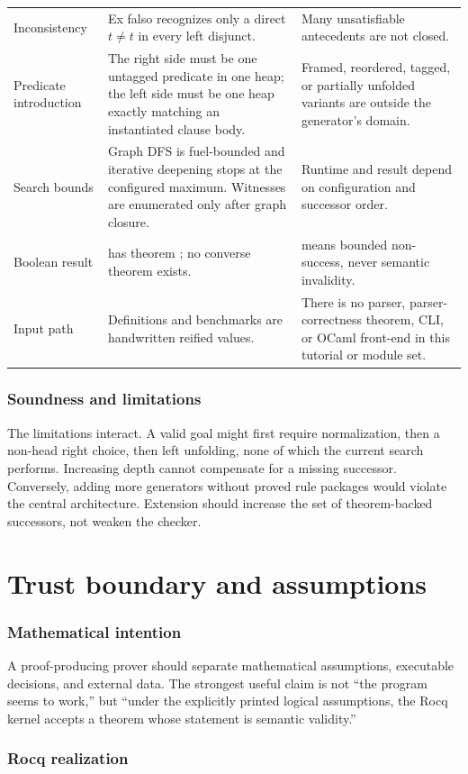 \documentclass[11pt,oneside]{book}
\DeclareRobustCommand{\code}[1]{\texttt{\detokenize{#1}}}
\newcommand{\mathintent}{\subsection*{Mathematical intention}}
\newcommand{\rocqreal}{\subsection*{Rocq realization}}
\newcommand{\soundlim}{\subsection*{Soundness and limitations}}
\begin{document}
\begin{longtable}{>{\raggedright\arraybackslash}p{}
                  >{\raggedright\arraybackslash}p{}
                  >{\raggedright\arraybackslash}p{}}
\addlinespace
Inconsistency & Ex falso recognizes only a direct \(t\neq t\) in every left
disjunct. & Many unsatisfiable antecedents are not closed.\\
\addlinespace
Predicate introduction & The right side must be one untagged predicate in one
heap; the left side must be one heap exactly matching an instantiated clause
body. & Framed, reordered, tagged, or partially unfolded variants are outside
the generator's domain.\\
\addlinespace
Search bounds & Graph DFS is fuel-bounded and iterative deepening stops at the
configured maximum.  Witnesses are enumerated only after graph closure. &
Runtime and result depend on configuration and successor order.\\
\addlinespace
Boolean result & \code{solvedb = true} has theorem \code{search_sound}; no
converse theorem exists. & \code{false} means bounded non-success, never
semantic invalidity.\\
\addlinespace
Input path & Definitions and benchmarks are handwritten reified values. &
There is no parser, parser-correctness theorem, CLI, or OCaml front-end in this
tutorial or module set.\\
\bottomrule
\end{longtable}

\soundlim

The limitations interact.  A valid goal might first require normalization,
then a non-head right choice, then left unfolding, none of which the current
search performs.  Increasing depth cannot compensate for a missing successor.
Conversely, adding more generators without proved rule packages would violate
the central architecture.  Extension should increase the set of theorem-backed
successors, not weaken the checker.

\chapter{Trust boundary and assumptions}
\label{ch:trust}

\mathintent

A proof-producing prover should separate mathematical assumptions, executable
decisions, and external data.  The strongest useful claim is not ``the program
seems to work,'' but ``under the explicitly printed logical assumptions, the
Rocq kernel accepts a theorem whose statement is semantic validity.''

\rocqreal
\end{document}
